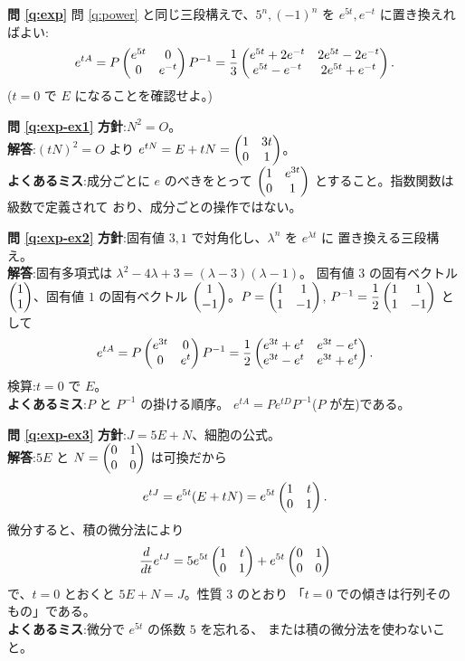 \bigskip
\noindent\textbf{問 \ref{q:exp}}\quad
問 \ref{q:power} と同じ三段構えで、$5^n, (-1)^n$ を
$e^{5t}, e^{-t}$ に置き換えればよい:
\[
e^{tA} = P\begin{pmatrix}e^{5t} & 0 \\ 0 & e^{-t}\end{pmatrix}P^{-1}
= \frac{1}{3}\begin{pmatrix}e^{5t} + 2e^{-t} & 2e^{5t} - 2e^{-t} \\
e^{5t} - e^{-t} & 2e^{5t} + e^{-t}\end{pmatrix}.
\]
($t = 0$ で $E$ になることを確認せよ。)

\bigskip
\noindent\textbf{問 \ref{q:exp-ex1}}\quad
\textbf{方針}:$N^2 = O$。\\
\textbf{解答}:$(tN)^2 = O$ より
$e^{tN} = E + tN = \begin{pmatrix}1 & 3t \\ 0 & 1\end{pmatrix}$。\\
\textbf{よくあるミス}:成分ごとに $e$ のべきをとって
$\begin{pmatrix}1 & e^{3t} \\ 0 & 1\end{pmatrix}$ とすること。指数関数は級数で定義されて
おり、成分ごとの操作ではない。

\bigskip
\noindent\textbf{問 \ref{q:exp-ex2}}\quad
\textbf{方針}:固有値 $3, 1$ で対角化し、$\lambda^n$ を $e^{\lambda t}$ に
置き換える三段構え。\\
\textbf{解答}:固有多項式は $\lambda^2 - 4\lambda + 3 = (\lambda - 3)(\lambda - 1)$。
固有値 $3$ の固有ベクトル $\begin{pmatrix}1 \\ 1\end{pmatrix}$、固有値 $1$ の固有ベクトル
$\begin{pmatrix}1 \\ -1\end{pmatrix}$。$P = \begin{pmatrix}1 & 1 \\ 1 & -1\end{pmatrix}$,
$P^{-1} = \dfrac{1}{2}\begin{pmatrix}1 & 1 \\ 1 & -1\end{pmatrix}$ として
\[
e^{tA} = P\begin{pmatrix}e^{3t} & 0 \\ 0 & e^{t}\end{pmatrix}P^{-1}
= \frac{1}{2}\begin{pmatrix}e^{3t} + e^{t} & e^{3t} - e^{t} \\
e^{3t} - e^{t} & e^{3t} + e^{t}\end{pmatrix}.
\]
検算:$t = 0$ で $E$。\\
\textbf{よくあるミス}:$P$ と $P^{-1}$ の掛ける順序。
$e^{tA} = P e^{tD} P^{-1}$($P$ が左)である。

\bigskip
\noindent\textbf{問 \ref{q:exp-ex3}}\quad
\textbf{方針}:$J = 5E + N$、細胞の公式。\\
\textbf{解答}:$5E$ と $N = \begin{pmatrix}0 & 1 \\ 0 & 0\end{pmatrix}$ は可換だから
\[
e^{tJ} = e^{5t}(E + tN) = e^{5t}\begin{pmatrix}1 & t \\ 0 & 1\end{pmatrix}.
\]
微分すると、積の微分法により
\[
\frac{d}{dt}e^{tJ} = 5e^{5t}\begin{pmatrix}1 & t \\ 0 & 1\end{pmatrix} + e^{5t}\begin{pmatrix}0 & 1 \\ 0 & 0\end{pmatrix}
\]
で、$t = 0$ とおくと $5E + N = J$。性質 3 のとおり
「$t = 0$ での傾きは行列そのもの」である。\\
\textbf{よくあるミス}:微分で $e^{5t}$ の係数 $5$ を忘れる、
または積の微分法を使わないこと。

